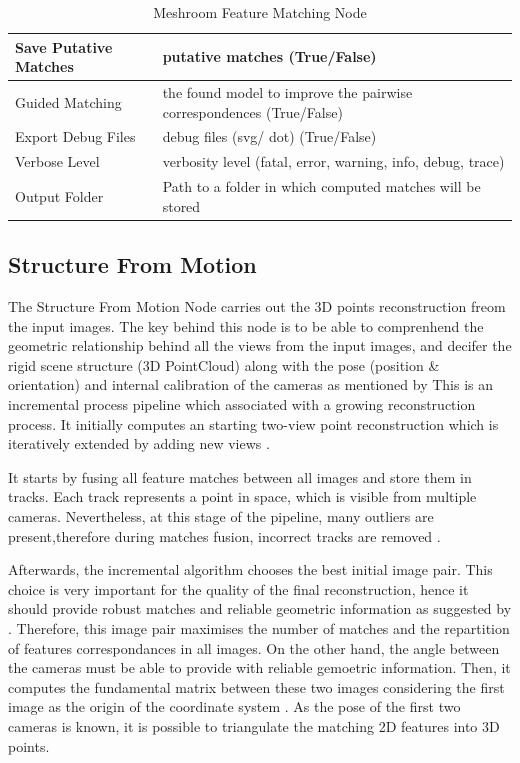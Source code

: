 \documentclass[12pt]{report}
\begin{document}
\begin{table}[h!]
{\begin{tabular}{|l|l|}
  Save Putative Matches &
    putative matches (True/False) \\ \hline
  Guided Matching &
    the found model to improve the pairwise correspondences (True/False) \\ \hline
  Export Debug Files &
    debug files (svg/ dot) (True/False) \\ \hline
  Verbose Level &
    verbosity level (fatal, error, warning, info, debug, trace) \\ \hline
  Output Folder &
    Path to a folder in which computed matches will be stored \\ \hline
  \end{tabular}%
  }
  \caption{Meshroom Feature Matching Node}
  \label{tab:FeatureMatching}
  \end{table}

\newpage
\subsection{Structure From Motion}

The Structure From Motion Node carries out the 3D points reconstruction freom the input images. The key behind this node is to be able to comprenhend
the geometric relationship behind all the views from the input images, and decifer the rigid scene structure (3D PointCloud) along with the pose (position \& orientation) and internal calibration of the cameras as mentioned by 
This is an incremental process pipeline which associated with a growing reconstruction process. It  initially computes an starting two-view point reconstruction which is iteratively extended by adding new views .

It starts by fusing all feature matches between all images and store them in tracks. Each track represents a point in space, which is visible from multiple cameras. 
Nevertheless, at this stage of the pipeline, many outliers are present,therefore during matches fusion, incorrect tracks are removed \citep*{Fischler1981RandomSC}.

Afterwards, the incremental algorithm chooses the best initial image pair. This choice is very important for the quality of the final reconstruction, hence it should provide robust matches and reliable geometric information as suggested by \citet*{Moulon2012}.
Therefore, this image pair maximises the number of matches and the repartition of features correspondances in all images. On the other hand, the angle between the cameras must be able to provide with reliable gemoetric information.
Then, it computes the fundamental matrix between these two images considering the first image as the origin of the coordinate system . As the pose of the first two cameras is known, 
it is possible to triangulate the matching 2D features into 3D points. 
\end{document}
